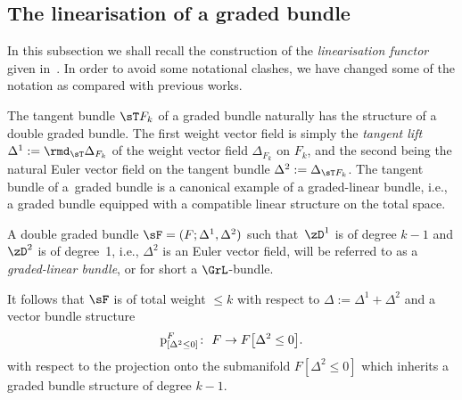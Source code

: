\subsection{The linearisation of a graded bundle}
 In this subsection we shall recall the construction of the \emph{linearisation functor} given in~\cite{Bruce:2014}. In order to avoid some notational clashes, we have changed some of the notation as compared with previous works.

The tangent bundle $\sT F_{k}$ of a graded bundle naturally has the structure of a double graded bundle. The f\/irst weight vector f\/ield is simply the \emph{tangent lift} \cite{Grabowski:1995,Yano:1973} $\Delta^{1} := \rmd_{\sT}\Delta_{F_{k}}$ of the weight vector f\/ield $\Delta_{F_{k}}$ on $F_{k}$, and the second being the natural Euler vector f\/ield on the tangent bundle $\Delta^{2} := \Delta_{\sT F_{k}}$. The tangent bundle of a~graded bundle is a canonical example of a graded-linear bundle, i.e., a graded bundle equipped with a compatible linear structure on the total space.

\begin{Definition} A double graded bundle $\sF = (F; \Delta^{1}, \Delta^{2})$ such that~$\zD^1$ is of degree $k-1$ and $\zD^2$ is of degree~1, i.e., $\Delta^{2}$ is an Euler vector f\/ield, will be referred to as a \emph{graded-linear bundle}, or for short a $\GrL$-bundle.
\end{Definition}

It follows that $\sF$ is of total weight $\le k$ with respect to $\Delta := \Delta^{1} + \Delta^{2}$ and a vector bundle structure
\begin{gather*}
\textnormal{p}^{F}_{[\Delta^{2} \leq 0]}\colon \  F \rightarrow F\big[\Delta^{2} \leq 0\big].
\end{gather*}
with respect to the projection onto the submanifold $F[\Delta^{2} \leq 0]$ which inherits a graded bundle structure of degree $k-1$.

